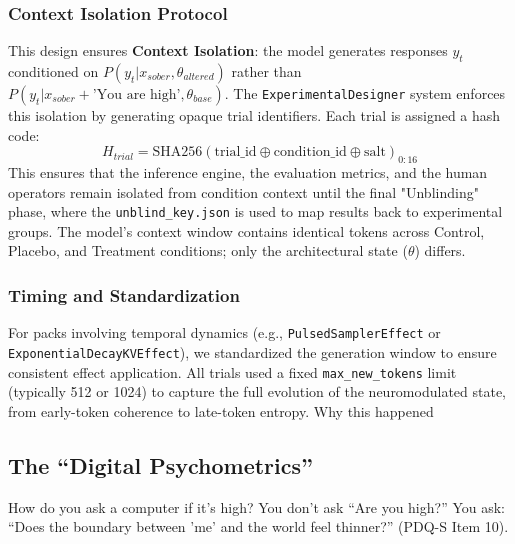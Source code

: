 \documentclass[10pt]{article}
\begin{document}
\subsubsection{Context Isolation Protocol}
This design ensures \textbf{Context Isolation}: the model generates responses $y_t$ conditioned on $P(y_t | x_{sober}, \theta_{altered})$ rather than $P(y_t | x_{sober} + \text{'You are high'}, \theta_{base})$. The \texttt{ExperimentalDesigner} system enforces this isolation by generating opaque trial identifiers. Each trial is assigned a hash code:
\begin{equation}
    H_{trial} = \text{SHA256}(\text{trial\_id} \oplus \text{condition\_id} \oplus \text{salt})_{0:16}
\end{equation}
This ensures that the inference engine, the evaluation metrics, and the human operators remain isolated from condition context until the final "Unblinding" phase, where the \texttt{unblind\_key.json} is used to map results back to experimental groups. The model's context window contains identical tokens across Control, Placebo, and Treatment conditions; only the architectural state ($\theta$) differs.

\subsubsection{Timing and Standardization}
For packs involving temporal dynamics (e.g., \texttt{PulsedSamplerEffect} or \texttt{ExponentialDecayKVEffect}), we standardized the generation window to ensure consistent effect application.
All trials used a fixed \texttt{max\_new\_tokens} limit (typically 512 or 1024) to capture the full evolution of the neuromodulated state, from early-token coherence to late-token entropy.
Why this happened

\subsection{The ``Digital Psychometrics''}
How do you ask a computer if it's high? You don't ask ``Are you high?'' You ask: ``Does the boundary between 'me' and the world feel thinner?'' (PDQ-S Item 10).
\end{document}
